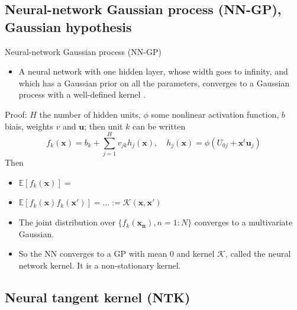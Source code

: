 \documentclass[9pt,handout]{beamer}
\begin{document}
\subsection{Neural-network Gaussian process (NN-GP), Gaussian hypothesis}

\begin{frame}{Neural-network Gaussian process (NN-GP)}
	\begin{itemize}
		\item 	A neural network with one hidden layer, whose width goes to infinity, and which has a Gaussian prior on all the parameters, converges to a Gaussian process with a well-defined kernel \citep{neal1996bayesian}.
	\end{itemize}
	\alert{Proof}: $H$ the number of hidden units, $\phi$ some nonlinear activation function, $b$ biais, weights $v$ and $\boldsymbol{u}$; then unit $k$ can be written
		$$f_k(\boldsymbol{x}) = b_k+\sum_{j=1}^H v_{jk}h_j(\boldsymbol{x}), \quad h_j(\boldsymbol{x}) = \phi(U_{0j}+\boldsymbol{x}^t \boldsymbol{u}_j)$$
		Then
		\begin{itemize}
			\item $\mathbb{E}[f_k(\boldsymbol{x})]=$
			\item $\mathbb{E}[f_k(\boldsymbol{x})f_k(\boldsymbol{x}')]=\ldots := \mathcal{K}(\boldsymbol{x},\boldsymbol{x}')$
			\item The joint distribution over $\{f_k(\boldsymbol{x_n}), n=1:N\}$ converges to a multivariate Gaussian.
			\item So the NN converges to a GP with mean 0 and kernel $\mathcal{K}$, called the \alert{neural network kernel}. It is a non-stationary kernel.
		\end{itemize}
\end{frame}


\subsection{Neural tangent kernel (NTK)}
\end{document}
